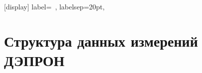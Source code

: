 \appendix
\sectionformat{\chapter}[display]{%
    label=\chaptertitlename\ \thechapter,%
    labelsep=20pt,
}
\renewcommand\thechapter{\Asbuk{chapter}} %



\chapter{Структура данных измерений ДЭПРОН} \label{AppendixA}




